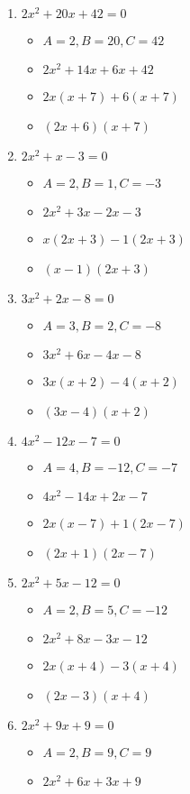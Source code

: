 \documentclass{article}
\begin{document}
\newpage
\begin{enumerate}
\item $2x^{2} + 20x + 42 = 0$
  \begin{itemize}
  \item $A=2, B=20, C=42$
  \item $2x^{2}+14x+6x+42$
  \item $2x(x+7)+6(x+7)$
  \item $(2x+6)(x+7)$
  \end{itemize}
\item $2x^{2} + x - 3 = 0$
  \begin{itemize}
  \item $A=2, B=1, C=-3$
  \item $2x^{2}+3x-2x-3$
  \item $x(2x+3)-1(2x+3)$
  \item $(x-1)(2x+3)$
  \end{itemize}
\item $3x^{2} + 2x - 8 = 0$
  \begin{itemize}
  \item $A=3, B=2, C=-8$
  \item $3x^{2}+6x-4x-8$
  \item $3x(x+2)-4(x+2)$
  \item $(3x-4)(x+2)$
  \end{itemize}
\item $4x^{2} - 12x - 7 = 0$
  \begin{itemize}
  \item $A=4, B=-12, C=-7$
  \item $4x^{2}-14x+2x-7$
  \item $2x(x-7)+1(2x-7)$
  \item $(2x+1)(2x-7)$
  \end{itemize}
\item $2x^{2} + 5x - 12 = 0$
  \begin{itemize}
  \item $A=2, B=5, C=-12$
  \item $2x^{2}+8x-3x-12$
  \item $2x(x+4)-3(x+4)$
  \item $(2x-3)(x+4)$
  \end{itemize}
\item $2x^{2} + 9x + 9 = 0$
  \begin{itemize}
  \item $A=2, B=9, C=9$
  \item $2x^{2}+6x+3x+9$

\end{itemize}
\end{enumerate}
\end{document}
